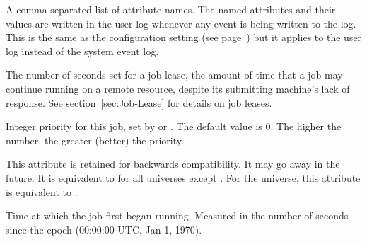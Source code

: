 \begin{description}
\label{JobAdInformationAttrs-job-attribute}
\item[\AdAttr{JobAdInformationAttrs}:] A comma-separated list
of attribute names.  The named attributes and their values are written
in the user log whenever any event is being written to the log.
This is the same as the configuration setting
 (see
page~\pageref{param:EventLogJobAdInformationAttrs}) but it applies to
the user log instead of the system event log.


\item[\AdAttr{JobLeaseDuration}:]  The number of seconds set for
a job lease, the amount of time that a job may continue running
on a remote resource,
despite its submitting machine's lack of response.
See section~\ref{sec:Job-Lease} for details on job leases.

\item[\AdAttr{JobPrio}:]  Integer priority for this job, set by
 or .  The default value is 0.  The higher
the number, the greater (better) the priority.

\item[\AdAttr{JobRunCount}:]  This attribute is retained for backwards
  compatibility.  It may go away in the future.  It is equivalent to
   for all universes except .
  For the  universe, this attribute is equivalent to
  .

\item[\AdAttr{JobStartDate}:]  Time at which the job first began
running.  Measured in the
number of seconds since the epoch (00:00:00 UTC, Jan 1, 1970).


\end{description}
